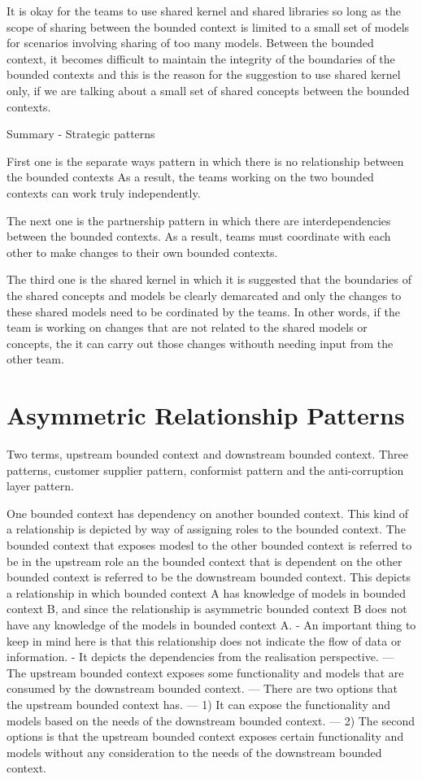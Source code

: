 It is okay for the teams to use shared kernel and shared libraries so long as the scope of sharing between the bounded context is limited to a small set of models for scenarios involving sharing of too many models.
Between the bounded context, it becomes difficult to maintain the integrity of the boundaries of the bounded contexts and this is the reason for the suggestion to use shared kernel only, if we are talking about a small set of shared concepts between the bounded contexts.

Summary - Strategic patterns

First one is the separate ways pattern in which there is no relationship between the bounded contexts
As a result, the teams working on the two bounded contexts can work truly independently.

The next one is the partnership pattern in which there are interdependencies between the bounded contexts.
As a result, teams must coordinate with each other to make changes to their own bounded contexts.

The third one is the shared kernel in which it is suggested that the boundaries of the shared concepts and models be clearly demarcated and only the changes to these shared models need to be cordinated by the teams.
In other words, if the team is working on changes that are not related to the shared models or concepts, the it can carry out those changes withouth needing input from the other team.

\section{Asymmetric Relationship Patterns}

Two terms, upstream bounded context and downstream bounded context.
Three patterns, customer supplier pattern, conformist pattern and the anti-corruption layer pattern.

One bounded context has dependency on another bounded context.
This kind of a relationship is depicted by way of assigning roles to the bounded context.
The bounded context that exposes modesl to the other bounded context is referred to be in the upstream role an the bounded context that is dependent on the other bounded context is referred to be the downstream bounded context.
This depicts a relationship in which bounded context A has knowledge of models in bounded context B, and since the relationship is asymmetric bounded context B does not have any knowledge of the models in bounded context A.
- An important thing to keep in mind here is that this relationship does not indicate the flow of data or information.
- It depicts the dependencies from the realisation perspective.
--- The upstream bounded context exposes some functionality and models that are consumed by the downstream bounded context.
--- There are two options that the upstream bounded context has.
--- 1) It can expose the functionality and models based on the needs of the downstream bounded context.
--- 2) The second options is that the upstream bounded context exposes certain functionality and models without any consideration to the needs of the downstream bounded context.

